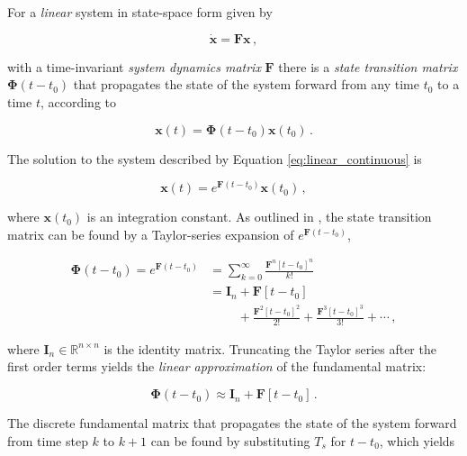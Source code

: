 For a \emph{linear} system in state-space form given by

\begin{equation}\label{eq:linear_continuous}
  \dot{\mathbf{x}} = \mathbf{F} \mathbf{x}\,,
\end{equation}

\noindent
with a time-invariant \emph{system dynamics matrix} $\mathbf{F}$ there is a \emph{state transition matrix} $\bm{\Phi}(t-t_0)$ that propagates the state of the system forward from any time $t_0$ to a time $t$, according to

\begin{equation}
  \mathbf{x}(t) = \bm{\Phi}(t-t_0) \mathbf{x}(t_0)\,.
\end{equation}

\noindent
The solution to the system described by Equation \ref{eq:linear_continuous} is 

\begin{equation}
  \mathbf{x}(t) = e^{\mathbf{F}(t-t_0)} \mathbf{x}(t_0)\,,
\end{equation}

\noindent
where $\mathbf{x}(t_0)$ is an integration constant. As outlined in \cite{zarchan2009fundamentals}, the state transition matrix can be found by a Taylor-series expansion of $e^{\mathbf{F}(t-t_0)}$,

\begin{equation}
\begin{split}
  \bm{\Phi}(t-t_0) = e^{\mathbf{F}(t-t_0)} &= \sum_{k=0} ^ {\infty} \frac {\mathbf{F}^{n} [t-t_0]^n}{k!} \\
  &= \mathbf{I}_n + \mathbf{F}[t-t_0] \\ 
  & \mathrel{\phantom{= \mathbf{I}_n}} + \frac{\mathbf{F}^2 [t-t_0]^2}{2!} +\frac{\mathbf{F}^{3} [t-t_0]^3}{3!} + \cdots\,,
\end{split}
\end{equation}
 
\noindent
where $\mathbf{I}_n \in \mathbb{R}^{n \times n}$ is the identity matrix. Truncating the Taylor series after the first order terms yields the \emph{linear approximation} of the fundamental matrix:

\begin{equation}
  \bm{\Phi}(t-t_0) \approx \mathbf{I}_n + \mathbf{F}[t-t_0]\,.
\end{equation}

\noindent
The discrete fundamental matrix that propagates the state of the system forward from time step $k$ to $k+1$ can be found by substituting $T_s$ for $t-t_0$, which yields

